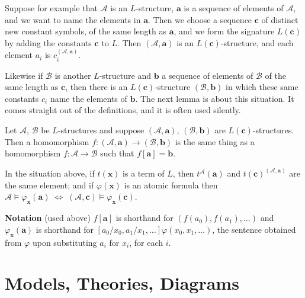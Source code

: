 \documentclass[a4paper,UKenglish,cleveref,autoref,thm-restate,12pt]{lipics-v2021-wjd}
\newcommand{\<}{\langle}
\renewcommand{\>}{\rangle}
\begin{document}
Suppose for example that \(\mathcal A\) is an \(L\)-structure,
\(\mathbf a\) is a sequence of elements of \(\mathcal A\), and we want
to name the elements in \(\mathbf a\). Then we choose a sequence
\(\mathbf c\) of distinct new constant symbols, of the same length as
\(\mathbf a\), and we form the signature \(L(\mathbf c)\) by adding the
constants \(\mathbf c\) to \(L\). Then \((\mathcal A, \mathbf a)\) is an
\(L(\mathbf c)\)-structure, and each element \(a_i\) is
\(c_i^{(\mathcal A, \mathbf a)}\).

Likewise if \(\mathcal B\) is another \(L\)-structure and \(\mathbf b\)
a sequence of elements of \(\mathcal B\) of the same length as
\(\mathbf c\), then there is an \(L(\mathbf c)\)-structure
\((\mathcal B, \mathbf b)\) in which these same constants \(c_i\) name
the elements of \(\mathbf b\). The next lemma is about this situation.
It comes straight out of the definitions, and it is often used silently.

\begin{lemma} Let \(\mathcal A\), \(\mathcal B\) be
\(L\)-structures and suppose \((\mathcal A, \mathbf a)\),
\((\mathcal B, \mathbf b)\) are \(L(\mathbf c)\)-structures. Then a
homomorphism
\(f \colon (\mathcal A, \mathbf a) \to (\mathcal B, \mathbf b)\) is the
same thing as a homomorphism \(f \colon \mathcal A \to \mathcal B\) such
that \(f[\mathbf a] = \mathbf b\).
\end{lemma}

In the situation above, if \(t(\mathbf x)\) is a term of \(L\), then
\(t^{\mathcal A}(\mathbf a)\) and
\(t(\mathbf c)^{(\mathcal A, \mathbf a)}\) are the same element; and if
\(\varphi(\mathbf x)\) is an atomic formula then
\(\mathcal A \vDash \varphi_{\mathbf x}(\mathbf a) \; \Leftrightarrow \; (\mathcal A, \mathbf c) \vDash \varphi_{\mathbf x}(\mathbf c)\).

\textbf{Notation} (used above) \(f[\mathbf a]\) is shorthand for
\((f(a_0), f(a_1), \dots)\) and \(\varphi_{\mathbf x}(\mathbf a)\) is
shorthand for \([a_0/x_0, a_1/x_1, \dots]\varphi(x_0, x_1, \dots)\), the
sentence obtained from \(\varphi\) upon substituting \(a_i\) for
\(x_i\), for each \(i\).


\section{Models, Theories, Diagrams}\label{models-theories-diagrams}
\end{document}
